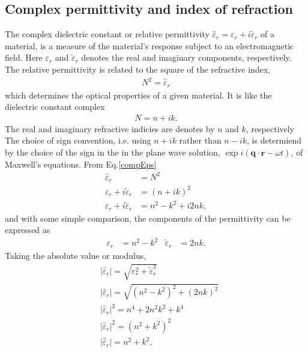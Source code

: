 \subsection{Complex permittivity and index of refraction \cite[p.~169-170]{Jensen1985}}
The complex dielectric constant or relative permittivity 
$\widehat\varepsilon_r = \varepsilon_r + i \tilde\varepsilon_r$ of a material, is a measure of 
the material's response subject to an electromagnetic field. Here $\varepsilon_r$ and $\tilde\varepsilon_r$ 
denotes the real and imaginary components, respectively.
The relative permittivity is related to
the square of the refractive index, 
\begin{align}
   N^2 = \widehat\varepsilon_r
   \label{compEps}
\end{align}
which determines the optical properties of a given material.
It is like the dielectric constant complex
\begin{align}
   N = n + i k.
\end{align}
The real and imaginary refractive indicies are denotes by $n$ and $k$, respectively
The choice of sign convention, i.e. using $n+ik$ rather than $n-ik$, is determiend by 
the choice of the sign in the in the plane wave solution,
$\exp i(\boldsymbol q \cdot \boldsymbol r - \omega t )$, of
Maxwell's equations.
%
From Eq.\eqref{compEps}
\begin{align}
   \widehat{\varepsilon}_r &= N^2 \\
   \varepsilon_r + i\tilde{\varepsilon}_r &= (n + ik)^2 \\
   \varepsilon_r + i\tilde{\varepsilon}_r &= n^2 - k^2 + i2nk,
\end{align}
and with some simple comparison, the components of the permittivity can be expressed as
\begin{align}
   \varepsilon_r &= n^2 - k^2     &\tilde{\varepsilon}_r  &= 2nk.
\end{align}
Taking the absolute value or modulus,
\begin{align}
   &\big|\widehat\varepsilon_r\big|   = \sqrt{ \varepsilon_r^2 + \tilde{\varepsilon}_r^2} \\
   &\big|\widehat\varepsilon_r\big|   = \sqrt{ (n^2 - k^2)^2 + (2nk)^2} \\
   &\big|\widehat\varepsilon_r\big|^2 = n^4 + 2n^2k^2 + k^4 \\
   &\big|\widehat\varepsilon_r\big|^2 = (n^2 + k^2)^2 \\
   &\big|\widehat\varepsilon_r\big|   = n^2 + k^2,
\end{align}
